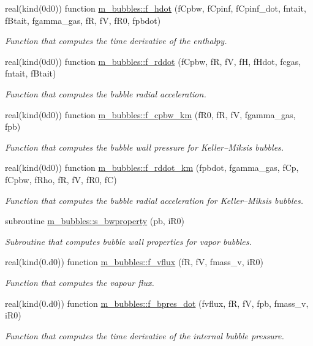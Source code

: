 \begin{DoxyCompactItemize}
real(kind(0d0)) function \hyperlink{namespacem__bubbles_aa7656a8db7cafecfff27383756eacce7}{m\+\_\+bubbles\+::f\+\_\+hdot} (f\+Cpbw, f\+Cpinf, f\+Cpinf\+\_\+dot, fntait, f\+Btait, fgamma\+\_\+gas, fR, fV, f\+R0, fpbdot)
\begin{DoxyCompactList}\small\item\em Function that computes the time derivative of the enthalpy. \end{DoxyCompactList}\item 
real(kind(0d0)) function \hyperlink{namespacem__bubbles_a1795309127be53d799a3374ba984498c}{m\+\_\+bubbles\+::f\+\_\+rddot} (f\+Cpbw, fR, fV, fH, f\+Hdot, fcgas, fntait, f\+Btait)
\begin{DoxyCompactList}\small\item\em Function that computes the bubble radial acceleration. \end{DoxyCompactList}\item 
real(kind(0d0)) function \hyperlink{namespacem__bubbles_a3af121d17dd214c10e2ea5881e124e28}{m\+\_\+bubbles\+::f\+\_\+cpbw\+\_\+km} (f\+R0, fR, fV, fgamma\+\_\+gas, fpb)
\begin{DoxyCompactList}\small\item\em Function that computes the bubble wall pressure for Keller--Miksis bubbles. \end{DoxyCompactList}\item 
real(kind(0d0)) function \hyperlink{namespacem__bubbles_a0d72f8fddc9e7423b723b71bd792463e}{m\+\_\+bubbles\+::f\+\_\+rddot\+\_\+km} (fpbdot, fgamma\+\_\+gas, f\+Cp, f\+Cpbw, f\+Rho, fR, fV, f\+R0, fC)
\begin{DoxyCompactList}\small\item\em Function that computes the bubble radial acceleration for Keller--Miksis bubbles. \end{DoxyCompactList}\item 
subroutine \hyperlink{namespacem__bubbles_a784afc585b20a8450d23867931c0b5fc}{m\+\_\+bubbles\+::s\+\_\+bwproperty} (pb, i\+R0)
\begin{DoxyCompactList}\small\item\em Subroutine that computes bubble wall properties for vapor bubbles. \end{DoxyCompactList}\item 
real(kind(0.d0)) function \hyperlink{namespacem__bubbles_ac487d49429a9af0456e14bedbadd0ef0}{m\+\_\+bubbles\+::f\+\_\+vflux} (fR, fV, fmass\+\_\+v, i\+R0)
\begin{DoxyCompactList}\small\item\em Function that computes the vapour flux. \end{DoxyCompactList}\item 
real(kind(0.d0)) function \hyperlink{namespacem__bubbles_a8d0c865e6ff2c884cb6b4147d7b58491}{m\+\_\+bubbles\+::f\+\_\+bpres\+\_\+dot} (fvflux, fR, fV, fpb, fmass\+\_\+v, i\+R0)
\begin{DoxyCompactList}\small\item\em Function that computes the time derivative of the internal bubble pressure. \end{DoxyCompactList}\end{DoxyCompactItemize}
